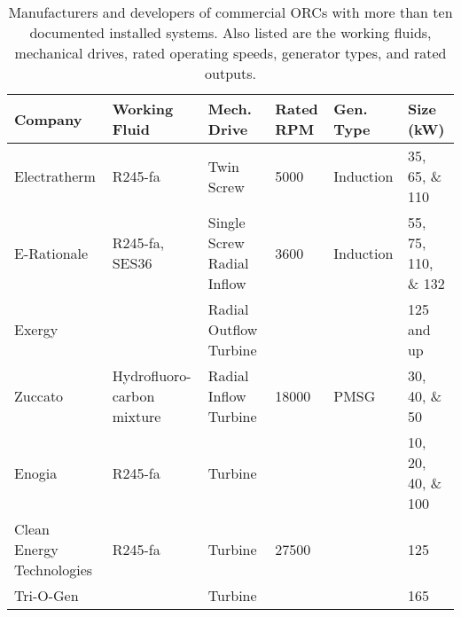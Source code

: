 \begin{table}
\centering
\caption{Manufacturers and developers of commercial ORCs with more than ten documented installed systems. Also listed are the working fluids, mechanical drives, rated operating speeds, generator types, and rated outputs.}
\label{tab:orc_manufacturers_com}
\begin{tabular}[c]{p{3.0cm}p{2.5cm}p{2.0cm}p{1.5cm}p{1.6cm}p{2.0cm}}%
	\toprule
	\textbf{Company}          & \textbf{Working Fluid}		& \textbf{Mech. Drive}			& \textbf{Rated RPM}	& \textbf{Gen. Type}	& \textbf{Size (kW)}  \\
	\midrule
	Electratherm              & R245-fa 					& Twin Screw 					& 5000				& Induction  			& \numlist{35;65;110} \\ 
	E-Rationale               & R245-fa, SES36 				& Single Screw Radial Inflow	& 3600				& Induction				& \numlist{55;75;110;132} \\ 
	Exergy                    &								& Radial Outflow Turbine		&            		& 						& 125 and up \\ 
	Zuccato                   & Hydrofluoro-carbon mixture	& Radial Inflow Turbine			& 18000				& PMSG 					& \numlist{30;40;50} \\ 
	Enogia                    & R245-fa						& Turbine 						& 					& 						& \numlist{10;20;40;100}\\ 
	Clean Energy Technologies & R245-fa						& Turbine 						& 27500				& 						& 125 \\ 
	Tri-O-Gen                 & 							& Turbine 						& 					& 						& 165 \\ \bottomrule

\end{tabular}
\end{table}

